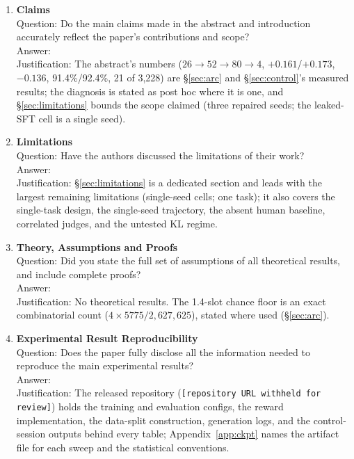\documentclass{article}
\newcommand{\repourl}{\texttt{[repository URL withheld for review]}}
\begin{document}
\begin{enumerate}

\item \textbf{Claims}\\
Question: Do the main claims made in the abstract and introduction accurately
reflect the paper's contributions and scope?\\
Answer: \answerYes{}\\
Justification: The abstract's numbers ($26 \rightarrow 52 \rightarrow 80
\rightarrow 4$, $+0.161$/$+0.173$, $-0.136$, 91.4\%/92.4\%, 21 of 3{,}228) are
\S\ref{sec:arc} and \S\ref{sec:control}'s measured results; the diagnosis is
stated as post hoc where it is one, and \S\ref{sec:limitations} bounds the
scope claimed (three repaired seeds; the leaked-SFT cell is a single seed).

\item \textbf{Limitations}\\
Question: Have the authors discussed the limitations of their work?\\
Answer: \answerYes{}\\
Justification: \S\ref{sec:limitations} is a dedicated section and leads with
the largest remaining limitations (single-seed cells; one task); it also covers the single-task
design, the single-seed trajectory, the absent human baseline, correlated
judges, and the untested KL regime.

\item \textbf{Theory, Assumptions and Proofs}\\
Question: Did you state the full set of assumptions of all theoretical results,
and include complete proofs?\\
Answer: \answerNA{}\\
Justification: No theoretical results. The 1.4-slot chance floor is an exact
combinatorial count ($4 \times 5775/2{,}627{,}625$), stated where used
(\S\ref{sec:arc}).

\item \textbf{Experimental Result Reproducibility}\\
Question: Does the paper fully disclose all the information needed to reproduce
the main experimental results?\\
Answer: \answerYes{}\\
Justification: The released repository (\repourl{}) holds the training and
evaluation configs, the reward implementation, the data-split construction,
generation logs, and the control-session outputs behind every table;
Appendix~\ref{app:ckpt} names the artifact file for each sweep and the
statistical conventions.


\end{enumerate}
\end{document}
